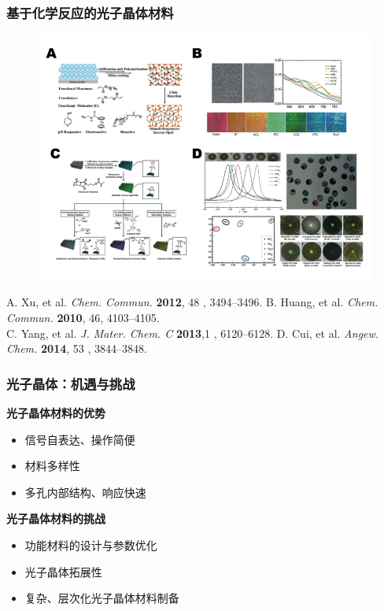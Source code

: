 \documentclass{beamer}
\begin{document}
\begin{frame}
  \frametitle{基于化学反应的光子晶体材料}
  \begin{figure}[t]
    \centering
    \includegraphics[width=0.74\linewidth]{figures/chem_react_phc.png}
  \end{figure}
  \tiny A. Xu, et al. \textit{Chem. Commun.} \textbf{2012}, 48 , 3494–3496. \tiny B. Huang, et al. \textit{Chem. Commun.} \textbf{2010}, 46, 4103–4105.\\
  \tiny C. Yang, et al. \textit{J. Mater. Chem. C} \textbf{2013},1 , 6120–6128. D. Cui, et al. \textit{Angew. Chem.} \textbf{2014}, 53 , 3844–3848.
\end{frame}


\begin{frame}
  \frametitle{光子晶体：机遇与挑战}
  \pause
  \textcolor{tsinghua}{\textbf{光子晶体材料的优势}}
  \begin{itemize}[<+-| alert@+>]
    \item
    信号自表达、操作简便
    \item
    材料多样性
    \item
    多孔内部结构、响应快速
  \end{itemize}
  \pause
  \textcolor{tsinghua}{\textbf{光子晶体材料的挑战}}
  \begin{itemize}[<+-| alert@+>]
    \item
    功能材料的设计与参数优化
    \item
    光子晶体拓展性
    \item
    复杂、层次化光子晶体材料制备
  \end{itemize}
\end{frame}
\end{document}
